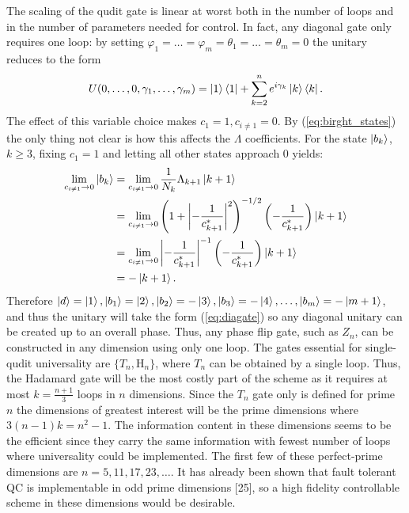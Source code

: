 The scaling of the qudit gate is linear at worst both in the number of loops and in the number of parameters needed for control. In fact, any diagonal gate only requires one loop: by setting $\varphi_1 = \dots = \varphi_m = \theta_1 = \dots = \theta_m = 0$ the unitary reduces to the form
\begin{equation}
\label{eq:diagate}
U(0,\dots,0,\gamma_1,\dots,\gamma_m) = \ket{1}\bra{1} + \sum_{k = 2}^n e^{i\gamma_k}\ket{k}\bra{k}.
\end{equation}
The effect of this variable choice makes $c_1 = 1, c_{i\neq 1} = 0$. By (\ref{eq:birght_states}) the only thing not clear is how this affects the $\Lambda$ coefficients.
For the state $\ket{b_k}$, $k \geq 3$, fixing $c_1 = 1$ and letting all other states approach $0$ yields:
\begin{equation}
\begin{aligned}
\lim_{c_{i\neq 1} \rightarrow 0} \ket{b_k} &= \lim_{c_{i\neq 1} \rightarrow 0}\frac{1}{N_k}\Lambda_{k+1} \ket{k+1}\\
&= \lim_{c_{i\neq 1} \rightarrow 0} \left(1  + \left|-\frac{1}{c_{k+1}^{*}}\right|^2 \right)^{-1/2}\left(-\frac{1}{c_{k+1}^{*}}\right) \ket{k+1} \\
&= \lim_{c_{i\neq 1} \rightarrow 0} \left|-\frac{1}{c_{k+1}^{*}}\right|^{-1}\left(-\frac{1}{c_{k+1}^{*}}\right) \ket{k+1} \\
& = -\ket{k+1}.
\end{aligned}
\end{equation}
Therefore $\ket{d} = \ket{1}, \ket{b_1} = \ket{2}, \ket{b_2} = -\ket{3}, \ket{b_3} = -\ket{4}, \dots, \ket{b_m} = -\ket{m+1}$, and thus the unitary will take the form (\ref{eq:diagate}) so any diagonal unitary can be created up to an overall phase. Thus, any phase flip gate, such as $Z_n$, can be constructed in any dimension using only one loop. 
The gates essential for single-qudit universality are $\{T_n, \text{H}_n\}$, where $T_n$ can be obtained by a single loop. Thus, the Hadamard gate will be the most costly part of the scheme as it requires at most $k = \frac{n+1}{3}$ loops in $n$ dimensions. Since the $T_n$ gate only is defined for prime $n$ the dimensions of greatest interest will be the prime dimensions where $3(n-1)k = n^2 -1$. The information content in these dimensions seems to be the efficient since they carry the same information with fewest number of loops where universality could be implemented. The first few of these perfect-prime dimensions are $n = 5,11,17,23,\dots$. It has already been shown that fault tolerant QC is implementable in odd prime dimensions [25], so a high fidelity controllable scheme in these dimensions would be desirable.


